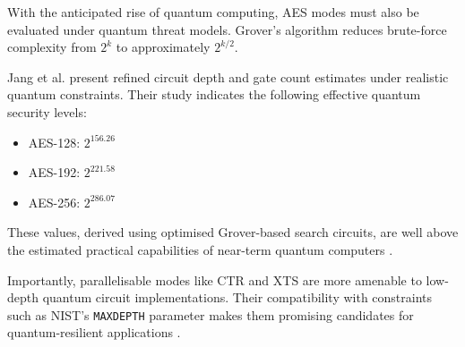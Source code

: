 \begin{table}[h]
    \centering
    \caption{Security characteristics of AES modes of operation.}
    \label{table:security-characteristics}
\end{table}

With the anticipated rise of quantum computing, AES modes must also be evaluated under quantum threat models. 
Grover's algorithm reduces brute-force complexity from $2^k$ to approximately $2^{k/2}$. 

Jang et al. \cite{Jang2025} present refined circuit depth and gate count estimates under realistic quantum constraints. 
Their study indicates the following effective quantum security levels:

\begin{itemize}
    \item AES-128: $2^{156.26}$
    \item AES-192: $2^{221.58}$
    \item AES-256: $2^{286.07}$
\end{itemize} 

These values, derived using optimised Grover-based search circuits, 
are well above the estimated practical capabilities of near-term quantum computers \cite{Jang2025}. 

Importantly, parallelisable modes like CTR and XTS are more amenable to low-depth quantum circuit implementations. 
Their compatibility with constraints such as NIST's \texttt{MAXDEPTH} parameter makes them promising candidates for quantum-resilient applications \cite{Jang2025}.

